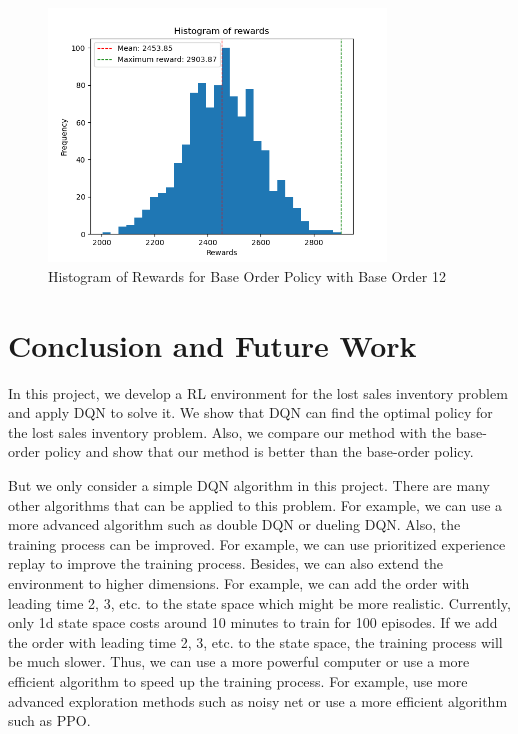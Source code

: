 \begin{figure}[H]
    \centering
    \includegraphics[width=0.8\textwidth]{figure/Histogram of rewards - Base 12.png}
    \caption{Histogram of Rewards for Base Order Policy with Base Order 12}
    \label{fig:hist-base-12}
\end{figure}


\section{Conclusion and Future Work}
In this project, we develop a RL environment for the lost sales inventory problem and apply DQN to solve it. We show that DQN can find the optimal policy for the lost sales inventory problem. Also, we compare our method with the base-order policy and show that our method is better than the base-order policy. 

But we only consider a simple DQN algorithm in this project. There are many other algorithms that can be applied to this problem. For example, we can use a more advanced algorithm such as double DQN or dueling DQN. Also, the training process can be improved. For example, we can use prioritized experience replay to improve the training process. Besides, we can also extend the environment to higher dimensions. For example, we can add the order with leading time 2, 3, etc. to the state space which might be more realistic. Currently, only 1d state space costs around 10 minutes to train for 100 episodes. If we add the order with leading time 2, 3, etc. to the state space, the training process will be much slower. Thus, we can use a more powerful computer or use a more efficient algorithm to speed up the training process. For example, use more advanced exploration methods such as noisy net or use a more efficient algorithm such as PPO.